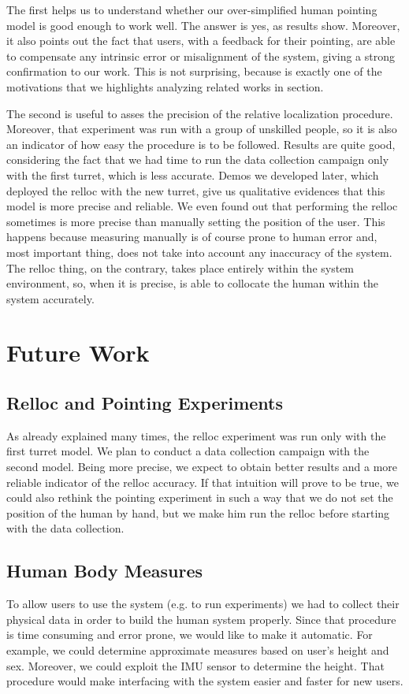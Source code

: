 The first helps us to understand whether our over-simplified human pointing model is good enough to work well. The answer is yes, as results show. Moreover, it also points out the fact that users, with a feedback for their pointing, are able to compensate any intrinsic error or misalignment of the system, giving a strong confirmation to our work. This is not surprising, because is exactly one of the motivations that we highlights analyzing related works in \textit{} section.

The second is useful to asses the precision of the relative localization procedure. Moreover, that experiment was run with a group of unskilled people, so it is also an indicator of how easy the procedure is to be followed. Results are quite good, considering the fact that we had time to run the data collection campaign only with the first turret, which is less accurate. Demos we developed later, which deployed the \ac{relloc} with the new turret, give us qualitative evidences that this model is more precise and reliable. We even found out that performing the \ac{relloc} sometimes is more precise than manually setting the position of the user. This happens because measuring manually is of course prone to human error and, most important thing, does not take into account any inaccuracy of the system. The \ac{relloc} thing, on the contrary, takes place entirely within the system environment, so, when it is precise, is able to collocate the human within the system accurately.

\section{Future Work}
\subsection{Relloc and Pointing Experiments}
As already explained many times, the \ac{relloc} experiment was run only with the first turret model. We plan to conduct a data collection campaign with the second model. Being more precise, we expect to obtain better results and a more reliable indicator of the \ac{relloc} accuracy. If that intuition will prove to be true, we could also rethink the pointing experiment in such a way that we do not set the position of the human by hand, but we make him run the \ac{relloc} before starting with the data collection.
\subsection{Human Body Measures}
To allow users to use the system (e.g. to run experiments) we had to collect their physical data in order to build the human system properly. Since that procedure is time consuming and error prone, we would like to make it automatic. For example, we could determine approximate measures based on user's height and sex. Moreover, we could exploit the \ac{IMU} sensor to determine the height. That procedure would make interfacing with the system easier and faster for new users.


